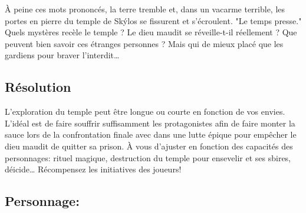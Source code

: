 À peine ces mots prononcés, la terre tremble et, dans un vacarme terrible, les portes en pierre du temple de Skýlos se fissurent et s'écroulent. "Le temps presse." Quels mystères recèle le temple ? Le dieu maudit se réveille-t-il réellement ? Que peuvent bien savoir ces étranges personnes ? Mais qui de mieux placé que les gardiens pour braver l'interdit\dots

\subsection{Résolution}

L'exploration du temple peut être longue ou courte en fonction de vos envies.
L'idéal est de faire souffrir suffisamment les protagonistes afin de faire monter la sauce lors de la confrontation finale avec \skylos dans une lutte épique pour empêcher le dieu maudit de quitter sa prison.
À vous d'ajuster en fonction des capacités des personnages: rituel magique, destruction du temple pour ensevelir \skylos et ses sbires, déicide\dots
Récompensez les initiatives des joueurs!

\subsection*{Personnage: \skylos}

